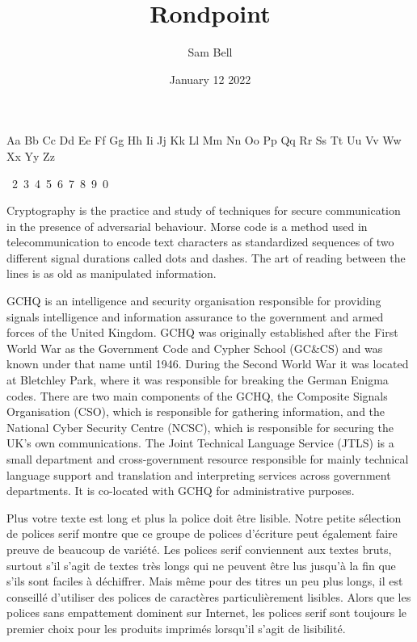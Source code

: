 \documentclass[12pt]{article}
\begin{document}
\title{\Huge Rondpoint}
\author{Sam Bell}
\date{January 12 2022}
\maketitle

\noindent\begin{minipage}{\textwidth}
\centering

\noindent\parbox{0.33\textwidth}{\noindent \large
Aa Bb Cc Dd Ee Ff Gg Hh Ii Jj Kk Ll Mm Nn Oo Pp Qq Rr Ss Tt Uu Vv Ww Xx Yy Zz

~2~3~4~5~6~7~8~9~0}
\end{minipage}

\vspace{1cm}

\noindent Cryptography is the practice and study of techniques for secure communication in the presence of adversarial behaviour. Morse code is a method used in telecommunication to encode text characters as standardized sequences of two different signal durations called dots and dashes. The art of reading between the lines is as old as manipulated information.

\vspace{1cm}
\noindent GCHQ is an intelligence and security organisation responsible for providing signals intelligence and information assurance to the government and armed forces of the United Kingdom. GCHQ was originally established after the First World War as the Government Code and Cypher School (GC{\&}CS) and was known under that name until 1946. During the Second World War it was located at Bletchley Park, where it was responsible for breaking the German Enigma codes. There are two main components of the GCHQ, the Composite Signals Organisation (CSO), which is responsible for gathering information, and the National Cyber Security Centre (NCSC), which is responsible for securing the UK's own communications. The Joint Technical Language Service (JTLS) is a small department and cross-government resource responsible for mainly technical language support and translation and interpreting services across government departments. It is co-located with GCHQ for administrative purposes. 

\vspace{1cm}
\noindent Plus votre texte est long et plus la police doit être lisible. Notre petite sélection de polices serif montre que ce groupe de polices d'écriture peut également faire preuve de beaucoup de variété. Les polices serif conviennent aux textes bruts, surtout s'il s'agit de textes très longs qui ne peuvent être lus jusqu'à la fin que s'ils sont faciles à déchiffrer. Mais même pour des titres un peu plus longs, il est conseillé d'utiliser des polices de caractères particulièrement lisibles. Alors que les polices sans empattement dominent sur Internet, les polices serif sont toujours le premier choix pour les produits imprimés lorsqu'il s'agit de lisibilité. 
\end{document}
